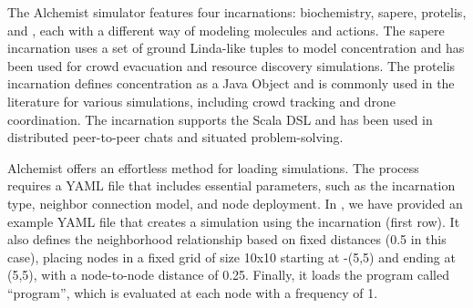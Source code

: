  The Alchemist simulator features four incarnations: 
  biochemistry, sapere, protelis, and \scafi{}, 
  each with a different way of modeling molecules and actions. 
The sapere incarnation uses a set of ground Linda-like tuples 
 to model concentration and has been used for crowd evacuation and resource discovery simulations. 
The protelis incarnation defines concentration as a Java Object and is commonly used in the literature for various simulations, 
 including crowd tracking and drone coordination. 
The \scafi{} incarnation supports the \scafi{} Scala DSL 
 and has been used in distributed peer-to-peer chats and situated problem-solving.

Alchemist offers an effortless method for loading simulations. 
 The process requires a YAML file that includes essential parameters, 
 such as the incarnation type, neighbor connection model, and node deployment. 
 In , we have provided an example YAML file 
 that creates a simulation using the \scafi{} incarnation (first row). 
 It also defines the neighborhood relationship based on fixed distances (0.5 in this case), 
 placing nodes in a fixed grid of size 10x10 starting at -(5,5) and ending at (5,5), 
 with a node-to-node distance of 0.25. 
 Finally, it loads the \scafi{} program called ``program'', 
 which is evaluated at each node with a frequency of 1. 
